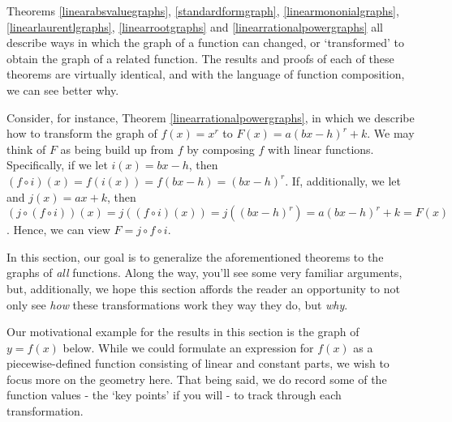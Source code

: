 \documentclass{ximera}
\begin{document}
	\author{Stitz-Zeager}




\setcounter{footnote}{0}

\label{Transformations}

Theorems \ref{linearabsvaluegraphs}, \ref{standardformgraph}, \ref{linearmononialgraphs},  \ref{linearlaurentlgraphs}, \ref{linearrootgraphs} and \ref{linearrationalpowergraphs} all describe ways in which the graph of a function can changed, or `transformed' to obtain the graph of a related function. The results and  proofs  of each of these theorems are virtually identical, and with the language of function composition, we can see better why.  

\smallskip

Consider, for instance, Theorem \ref{linearrationalpowergraphs}, in which we describe how to transform the graph of $f(x) = x^r$ to  $F(x) = a(bx-h)^r +k$.  We may think of $F$ as being build up from $f$ by composing $f$ with linear functions.  Specifically, if we let $i(x) = bx-h$, then $(f\circ i)(x) = f(i(x)) = f(bx-h) = (bx-h)^r$.  If, additionally, we let and $j(x) = ax+k$, then $(j \circ (f \circ i))(x) = j( (f \circ i)(x)) = j((bx-h)^r) = a(bx-h)^r+k = F(x)$.  Hence, we can view $F = j \circ f \circ i$.  

\smallskip

In this section, our goal is to generalize the aforementioned theorems to the graphs of \textit{all} functions.  Along the way, you'll see some very familiar arguments, but, additionally, we hope this section affords the reader an opportunity to not only see \textit{how} these transformations work they way they do, but \textit{why}.

\smallskip

Our motivational example for the results in this section is the graph of $y = f(x)$ below.  While we could formulate an expression for $f(x)$ as a piecewise-defined function consisting of linear and constant parts, we wish to focus more on the geometry here.  That being said, we do record some of the function values - the `key points' if you will - to track through each transformation.
\end{document}
